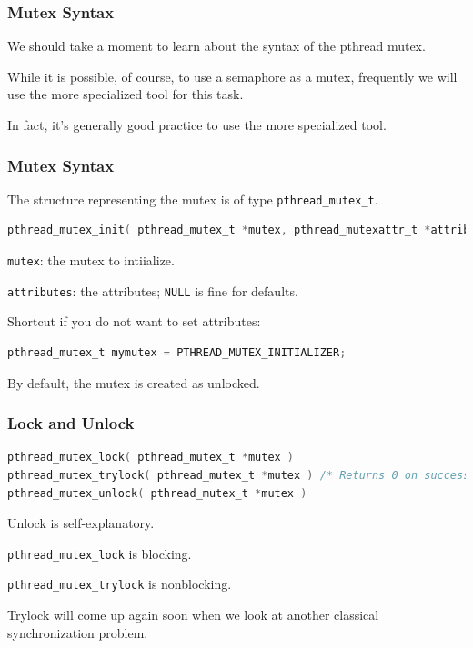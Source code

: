 \begin{frame}
\frametitle{Mutex Syntax}

We should take a moment to learn about the syntax of the pthread mutex. 

While it is possible, of course, to use a semaphore as a mutex, frequently we will use the more specialized tool for this task.

In fact, it's generally good practice to use the more specialized tool.

\end{frame}

\begin{frame}[fragile]
\frametitle{Mutex Syntax}

The structure representing the mutex is of type \texttt{pthread\_mutex\_t}. 

\begin{lstlisting}[language=C]
pthread_mutex_init( pthread_mutex_t *mutex, pthread_mutexattr_t *attributes )
\end{lstlisting}

\texttt{mutex}: the mutex to intiialize.

\texttt{attributes}: the attributes; \texttt{NULL} is fine for defaults.

Shortcut if you do not want to set attributes:

\begin{lstlisting}[language=C]
pthread_mutex_t mymutex = PTHREAD_MUTEX_INITIALIZER;
\end{lstlisting}

By default, the mutex is created as unlocked.

\end{frame}

\begin{frame}[fragile]
\frametitle{Lock and Unlock}

\begin{lstlisting}[language=C]
pthread_mutex_lock( pthread_mutex_t *mutex )
pthread_mutex_trylock( pthread_mutex_t *mutex ) /* Returns 0 on success */
pthread_mutex_unlock( pthread_mutex_t *mutex )
\end{lstlisting}

Unlock is self-explanatory.

\texttt{pthread\_mutex\_lock} is blocking.

\texttt{pthread\_mutex\_trylock} is nonblocking.

Trylock will come up again soon when we look at another classical synchronization problem.

\end{frame}

